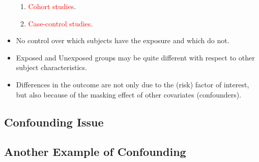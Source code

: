 \begin{itemize}
\begin{enumerate}
                  \item \textcolor{Red}{Cohort studies}.
                  \item \textcolor{Red}{Case-control studies}.
            \end{enumerate}
      \item No control over which subjects have the exposure and which
            do not.
      \item Exposed and Unexposed groups may be quite different with
            respect to other subject characteristics.
      \item Differences in the outcome are not only due to the (risk)
            factor of interest, but also because of the masking effect of
            other covariates (confounders).
\end{itemize}
\subsection*{Confounding Issue}
\begin{figure}[H]
      \centering
\end{figure}
\subsection*{Another Example of Confounding}
\begin{figure}[H]
      \centering
\end{figure}
